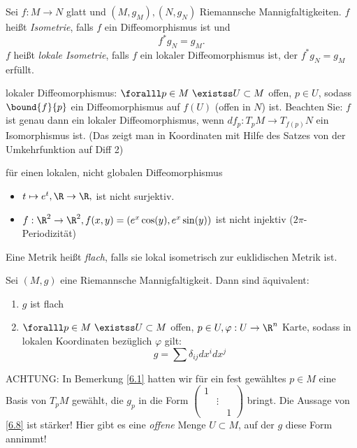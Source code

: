 \begin{defn*}
	Sei $ f:M \to N $ glatt und $ (M,g_M),(N,g_N) $ Riemannsche Mannigfaltigkeiten. $f$ heißt \emph{Isometrie}, falls $f$ ein Diffeomorphismus ist und 
	$$f^*g_N = g_M.$$
	$f$ heißt \emph{lokale Isometrie}, falls $f$ ein lokaler Diffeomorphismus ist, der $ f^*g_N = g_M $ erfüllt.
\end{defn*}

\begin{rem}
	lokaler Diffeomorphismus: $ \foralll p \in M \ \existss U \subset M $ offen, $p \in U$, sodass $ \bound{f}{p} $ ein Diffeomorphismus auf $f(U)$ (offen in $N$) ist. Beachten Sie: $f$ ist genau dann ein lokaler Diffeomorphismus, wenn $ df_p: T_pM \to T_{f(p)}N $ ein Isomorphismus ist. (Das zeigt man in Koordinaten mit Hilfe des Satzes von der Umkehrfunktion auf Diff 2)
\end{rem}

\begin{exmp*}
	für einen lokalen, nicht globalen Diffeomorphismus
	\begin{itemize}
		\item $t \mapsto e^t, \R \to \R,$ ist nicht surjektiv.
		\item $ f: \R^2 \to \R^2, f(x,y) = (e^x\cos(y),e^x\sin(y)) $ ist nicht injektiv ($2\pi$-Periodizität)
	\end{itemize}
\end{exmp*}

\begin{defn*}
	Eine Metrik heißt \emph{flach}, falls sie lokal isometrisch zur euklidischen Metrik ist.
\end{defn*}

\begin{thm}\label{6.8}
	Sei $ (M,g) $ eine Riemannsche Mannigfaltigkeit. Dann sind äquivalent:
	\begin{enumerate}[label={\roman*})]
		\item $g$ ist flach
		\item $ \foralll p \in M \ \existss U \subset M $ offen, $p \in U, \varphi: U \to \R^n$ Karte, sodass in lokalen Koordinaten bezüglich $\varphi$ gilt:
			\[ g = \sum \delta_{ij} dx^i dx^j \]
	\end{enumerate}
\end{thm}

\begin{rem*}
	ACHTUNG: In Bemerkung \ref{6.1} hatten wir für ein fest gewähltes $p \in M$ eine Basis von $ T_pM $ gewählt, die $g_p$ in die Form $ \begin{pmatrix}
		1&&\\&\vdots&\\&&1
	\end{pmatrix} $ bringt. Die Aussage von \ref{6.8} ist stärker! Hier gibt es eine \emph{offene} Menge $ U \subset M $, auf der $g$ diese Form annimmt!
\end{rem*}

